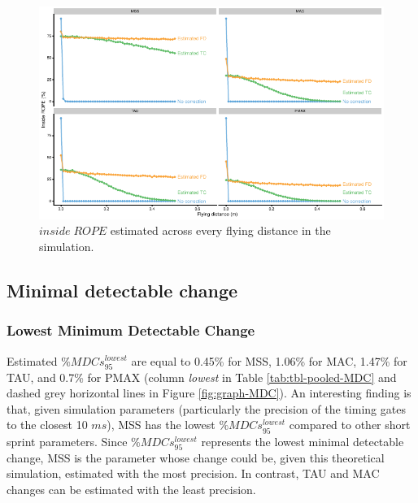 \documentclass[fleqn,10pt,lineno]{wlpeerj} %
\begin{document}
\begin{figure}

{\centering \includegraphics[width=0.9\linewidth]{shorts-simulation-paper_files/figure-latex/graph-inside-ROPE-1} 

}

\caption{\(inside \; ROPE\) estimated across every flying distance in the simulation.}\label{fig:graph-inside-ROPE}
\end{figure}

\hypertarget{minimal-detectable-change}{%
\subsection{Minimal detectable change}\label{minimal-detectable-change}}

\hypertarget{lowest-minimum-detectable-change}{%
\subsubsection{Lowest Minimum Detectable Change}\label{lowest-minimum-detectable-change}}

Estimated \(\%MDCs_{95}^{lowest}\) are equal to 0.45\% for MSS, 1.06\% for MAC, 1.47\% for TAU, and 0.7\% for PMAX (column \emph{lowest} in Table \ref{tab:tbl-pooled-MDC} and dashed grey horizontal lines in Figure \ref{fig:graph-MDC}). An interesting finding is that, given simulation parameters (particularly the precision of the timing gates to the closest 10 \(ms\)), MSS has the lowest \(\%MDCs_{95}^{lowest}\) compared to other short sprint parameters. Since \(\%MDCs_{95}^{lowest}\) represents the lowest minimal detectable change, MSS is the parameter whose change could be, given this theoretical simulation, estimated with the most precision. In contrast, TAU and MAC changes can be estimated with the least precision.
\end{document}
